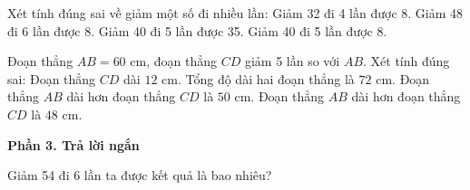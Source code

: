 \begin{ex} %
Xét tính đúng sai về giảm một số đi nhiều lần:
\choiceTF
{\True Giảm 32 đi 4 lần được 8.}
{\True Giảm 48 đi 6 lần được 8.}
{Giảm 40 đi 5 lần được 35.}
{\True Giảm 40 đi 5 lần được 8.}
\end{ex}

\begin{ex} %
Đoạn thẳng $AB = 60\text{ cm}$, đoạn thẳng $CD$ giảm 5 lần so với $AB$. Xét tính đúng sai:
\choiceTF
{\True Đoạn thẳng $CD$ dài $12\text{ cm}$.}
{\True Tổng độ dài hai đoạn thẳng là $72\text{ cm}$.}
{Đoạn thẳng $AB$ dài hơn đoạn thẳng $CD$ là $50\text{ cm}$.}
{\True Đoạn thẳng $AB$ dài hơn đoạn thẳng $CD$ là $48\text{ cm}$.}
\end{ex}

\textbf{Phần 3. Trả lời ngắn}

\begin{ex} %
Giảm 54 đi 6 lần ta được kết quả là bao nhiêu?
\end{ex}

